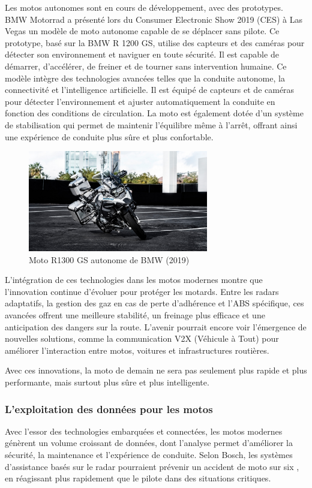 Les motos autonomes sont en cours de développement, avec des prototypes. BMW Motorrad a présenté lors du Consumer Electronic Show 2019 (CES) à Las Vegas \cite{moto_autonome} un modèle de moto autonome capable de se déplacer sans pilote. Ce prototype, basé sur la BMW R 1200 GS, utilise des capteurs et des caméras pour détecter son environnement et naviguer en toute sécurité. Il est capable de démarrer, d’accélérer, de freiner et de tourner sans intervention humaine. 
Ce modèle intègre des technologies avancées telles que la conduite autonome, la connectivité et l’intelligence artificielle. Il est équipé de capteurs et de caméras pour détecter l’environnement et ajuster automatiquement la conduite en fonction des conditions de circulation. La moto est également dotée d’un système de stabilisation qui permet de maintenir l’équilibre même à l’arrêt, offrant ainsi une expérience de conduite plus sûre et plus confortable.

\begin{figure}[H]
    \centering
    \includegraphics[width=0.7\textwidth]{etat_art/images/bmw.jpeg} 
    \caption{Moto R1300 GS autonome de BMW (2019)}
\end{figure}


L’intégration de ces technologies dans les motos modernes montre que l’innovation continue d’évoluer pour protéger les motards. Entre les radars adaptatifs, la gestion des gaz en cas de perte d’adhérence et l’ABS spécifique, ces avancées offrent une meilleure stabilité, un freinage plus efficace et une anticipation des dangers sur la route. L’avenir pourrait encore voir l’émergence de nouvelles solutions, comme la communication V2X (Véhicule à Tout) pour améliorer l’interaction entre motos, voitures et infrastructures routières.

Avec ces innovations, la moto de demain ne sera pas seulement plus rapide et plus performante, mais surtout plus sûre et plus intelligente. 

\subsubsection{L'exploitation des données pour les motos}
Avec l’essor des technologies embarquées et connectées, les motos modernes génèrent un volume croissant de données, dont l’analyse permet d’améliorer la sécurité, la maintenance et l’expérience de conduite.
Selon Bosch, les systèmes d’assistance basés sur le radar pourraient prévenir un accident de moto sur six \cite{aras_bosh_site_off}, en réagissant plus rapidement que le pilote dans des situations critiques. 


